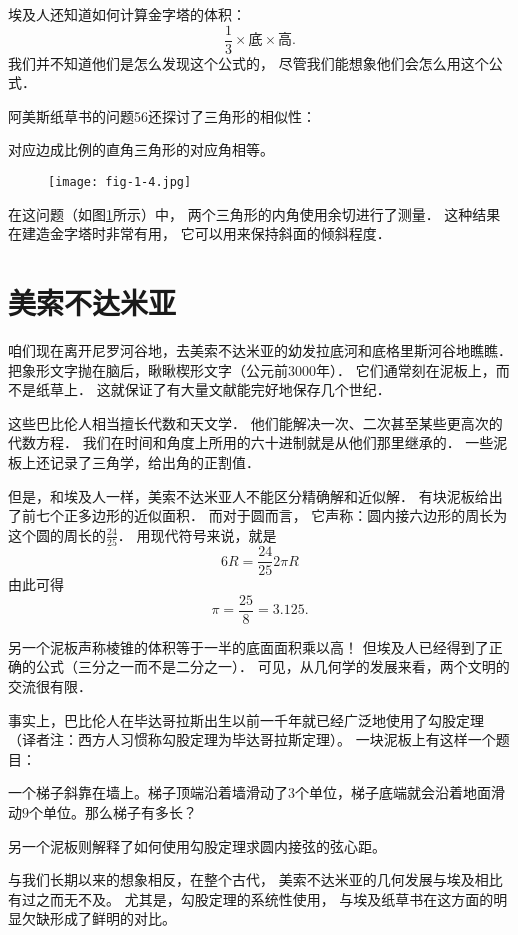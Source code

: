 \documentclass[cn,fancy,blue,11pt]{elegantbook}
\begin{document}
埃及人还知道如何计算金字塔的体积：
\[\frac{1}{3}\times\textrm{底}\times\textrm{高}.\]
我们并不知道他们是怎么发现这个公式的，
尽管我们能想象他们会怎么用这个公式．

阿美斯纸草书的问题56还探讨了三角形的相似性：
\begin{framed}
	对应边成比例的直角三角形的对应角相等。
\end{framed}
\begin{figure}[htbp]
	\centering
	\texttt{[image: fig-1-4.jpg]}
	\caption{\label{fig:1-4}}
\end{figure}
在这问题（如图\ref{fig:1-4}所示）中，
两个三角形的内角使用余切进行了测量．
这种结果在建造金字塔时非常有用，
它可以用来保持斜面的倾斜程度．

\section{美索不达米亚}

咱们现在离开尼罗河谷地，去美索不达米亚的幼发拉底河和底格里斯河谷地瞧瞧．
把象形文字抛在脑后，瞅瞅楔形文字（公元前3000年）．
它们通常刻在泥板上，而不是纸草上．
这就保证了有大量文献能完好地保存几个世纪．

这些巴比伦人相当擅长代数和天文学．
他们能解决一次、二次甚至某些更高次的代数方程．
我们在时间和角度上所用的六十进制就是从他们那里继承的．
一些泥板上还记录了三角学，给出角的正割值．

但是，和埃及人一样，美索不达米亚人不能区分精确解和近似解．
有块泥板给出了前七个正多边形的近似面积．
而对于圆而言，
它声称：圆内接六边形的周长为这个圆的周长的$\frac{24}{25}$．
用现代符号来说，就是
\[6R=\frac{24}{25}2\pi R\]
由此可得
\[\pi=\frac{25}{8}=3.125.\]

另一个泥板声称棱锥的体积等于一半的底面面积乘以高！
但埃及人已经得到了正确的公式（三分之一而不是二分之一）．
可见，从几何学的发展来看，两个文明的交流很有限．

事实上，巴比伦人在毕达哥拉斯出生以前一千年就已经广泛地使用了勾股定理
（译者注：西方人习惯称勾股定理为毕达哥拉斯定理）。
一块泥板上有这样一个题目：
\begin{framed}
	一个梯子斜靠在墙上。梯子顶端沿着墙滑动了$3$个单位，梯子底端就会沿着地面滑动$9$个单位。那么梯子有多长？
\end{framed}
另一个泥板则解释了如何使用勾股定理求圆内接弦的弦心距。

与我们长期以来的想象相反，在整个古代，
美索不达米亚的几何发展与埃及相比有过之而无不及。
尤其是，勾股定理的系统性使用，
与埃及纸草书在这方面的明显欠缺形成了鲜明的对比。
\end{document}
